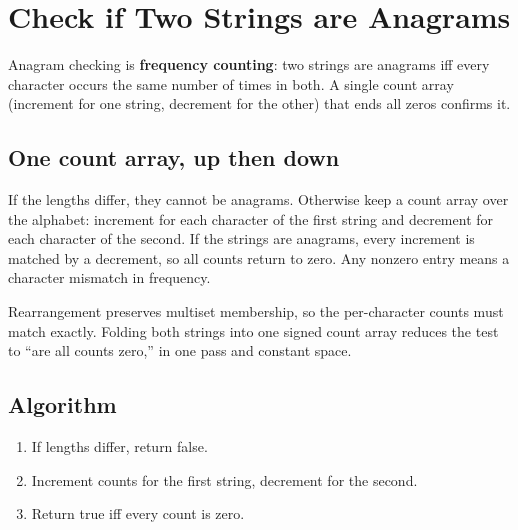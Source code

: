 \section{Check if Two Strings are Anagrams}
\label{sec:str-anagram}


\begin{patternbox}
Anagram checking is \textbf{frequency counting}: two strings are anagrams
iff every character occurs the same number of times in both. A single
count array (increment for one string, decrement for the other) that ends
all zeros confirms it.
\end{patternbox}

\subsection*{One count array, up then down}

If the lengths differ, they cannot be anagrams. Otherwise keep a count
array over the alphabet: increment for each character of the first string
and decrement for each character of the second. If the strings are
anagrams, every increment is matched by a decrement, so all counts return to
zero. Any nonzero entry means a character mismatch in frequency.

\begin{ideabox}
Rearrangement preserves multiset membership, so the per-character counts
must match exactly. Folding both strings into one signed count array reduces
the test to ``are all counts zero,'' in one pass and constant space.
\end{ideabox}

\subsection*{Algorithm}

\begin{enumerate}
  \item If lengths differ, return false.
  \item Increment counts for the first string, decrement for the second.
  \item Return true iff every count is zero.
\end{enumerate}

